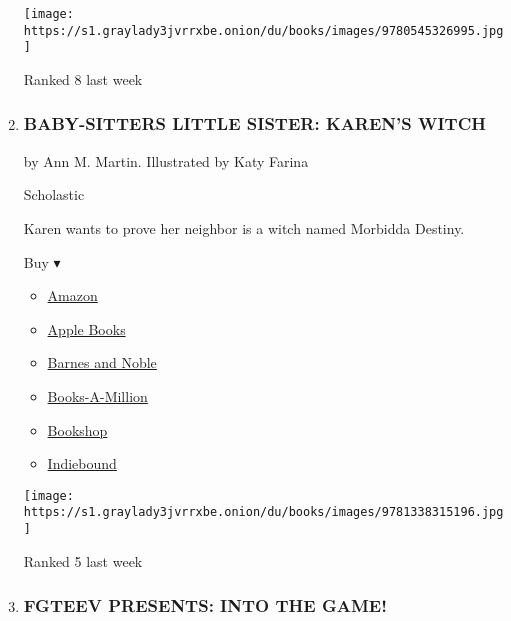 \begin{enumerate}
  \texttt{[image: https://s1.graylady3jvrrxbe.onion/du/books/images/9780545326995.jpg]}

  Ranked 8 last week
\item
  \hypertarget{baby-sitters-little-sister-karens-witch}{%
  \subsubsection{BABY-SITTERS LITTLE SISTER: KAREN'S
  WITCH}\label{baby-sitters-little-sister-karens-witch}}

  by Ann M. Martin. Illustrated by Katy Farina

  Scholastic

  Karen wants to prove her neighbor is a witch named Morbidda Destiny.

  Buy ▾

  \begin{itemize}
  \tightlist
  \item
    \href{https://www.amazon.com/Karens-Baby-Sitters-Little-Sister-Graphix/dp/1338315196?tag=NYTBS-20}{Amazon}
  \item
    \href{https://du-gae-books-dot-nyt-du-prd.appspot.com/buy?title=BABY-SITTERS+LITTLE+SISTER\%3A+KAREN\%27S+WITCH\&author=Ann+M+Martin}{Apple
    Books}
  \item
    \href{https://www.anrdoezrs.net/click-7990613-11819508?url=https\%3A\%2F\%2Fwww.barnesandnoble.com\%2Fw\%2F\%3Fean\%3D9781338315196}{Barnes
    and Noble}
  \item
    \href{https://www.anrdoezrs.net/click-7990613-35140?url=https\%3A\%2F\%2Fwww.booksamillion.com\%2Fp\%2FBABY-SITTERS\%2BLITTLE\%2BSISTER\%253A\%2BKAREN\%2527S\%2BWITCH\%2FAnn\%2BM\%2BMartin\%2F9781338315196}{Books-A-Million}
  \item
    \href{https://bookshop.org/a/3546/9781338315196}{Bookshop}
  \item
    \href{https://www.indiebound.org/book/9781338315196?aff=NYT}{Indiebound}
  \end{itemize}

  \texttt{[image: https://s1.graylady3jvrrxbe.onion/du/books/images/9781338315196.jpg]}

  Ranked 5 last week
\item
  \hypertarget{fgteev-presents-into-the-game}{%
  \subsubsection{FGTEEV PRESENTS: INTO THE
  GAME!}\label{fgteev-presents-into-the-game}}


\end{enumerate}
